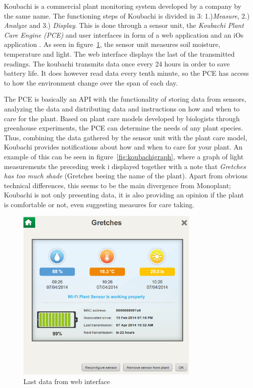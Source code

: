 Koubachi is a commercial plant monitoring system developed by a company by the same name. The functioning steps of Koubachi is divided in 3: 1.)\emph{Measure}, 2.) \emph{Analyze} and 3.) \emph{Display}. This is done through a sensor unit, the \emph{Koubachi Plant Care Engine (PCE)} and user interfaces in form of a web application and an iOs application \citep{koubachi}. As seen in figure~\ref{fig:koubachidata}, the sensor unit measures soil moisture, temperature and light. The web interface displays the last of the transmitted readings. The koubachi transmits data once every 24 hours in order to save battery life. It does however read data every tenth minute, so the PCE has access to how the environment change over the span of each day.

The PCE is basically an API with the functionality of storing data from sensors, analyzing the data and distributing data and instructions on how and when to care for the plant. Based on plant care models developed by biologists through greenhouse experiments, the PCE can determine the needs of any plant species. Thus, combining the data gathered by the sensor unit with the plant care model, Koubachi provides notifications about how and when to care for your plant. An example of this can be seen in figure~\ref{fig:koubachigraph}, where a graph of light measurements the preceding week i displayed together with a note that \emph{Gretches has too much shade} (Gretches beeing the name of the plant). Apart from obvious technical differences, this seems to be the main divergence from Monoplant; Koubachi is not only presenting data, it is also providing an opinion if the plant is comfortable or not, even suggesting measures for care taking.

\begin{figure}
        \centering
        \includegraphics[width=0.8\textwidth]{img/koubachi/instantdata.png}
        \caption{Last data from web interface}
        \label{fig:koubachidata}
\end{figure}

